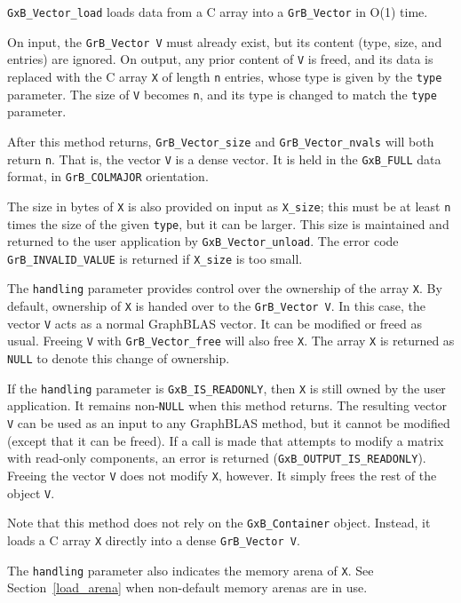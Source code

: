 \verb'GxB_Vector_load' loads data from a C array into a \verb'GrB_Vector' in
O(1) time.

On input, the \verb'GrB_Vector V' must already exist, but its content (type,
size, and entries) are ignored.  On output, any prior content of \verb'V' is
freed, and its data is replaced with the C array \verb'X' of length \verb'n'
entries, whose type is given by the \verb'type' parameter.  The size of
\verb'V' becomes \verb'n', and its type is changed to match the \verb'type'
parameter.

After this method returns, \verb'GrB_Vector_size' and \verb'GrB_Vector_nvals'
will both return \verb'n'.  That is, the vector \verb'V' is a dense vector.
It is held in the \verb'GxB_FULL' data format, in \verb'GrB_COLMAJOR'
orientation.

The size in bytes of \verb'X' is also provided on input as \verb'X_size'; this
must be at least \verb'n' times the size of the given \verb'type', but it can
be larger.  This size is maintained and returned to the user application by
\verb'GxB_Vector_unload'.  The error code \verb'GrB_INVALID_VALUE' is returned
if \verb'X_size' is too small.

The \verb'handling' parameter provides control over the ownership of the array
\verb'X'.  By default, ownership of \verb'X' is handed over to the
\verb'GrB_Vector V'.  In this case, the vector \verb'V' acts as a normal
GraphBLAS vector.  It can be modified or freed as usual.  Freeing \verb'V' with
\verb'GrB_Vector_free' will also free \verb'X'.  The array \verb'X' is returned
as \verb'NULL' to denote this change of ownership.

If the \verb'handling' parameter is \verb'GxB_IS_READONLY', then \verb'X' is
still owned by the user application.  It remains non-\verb'NULL' when this
method returns.  The resulting vector \verb'V' can be used as an input to any
GraphBLAS method, but it cannot be modified (except that it can be freed).
If a call is made that attempts to modify a matrix with read-only components,
an error is returned (\verb'GxB_OUTPUT_IS_READONLY').
Freeing the vector \verb'V' does not modify \verb'X', however.  It simply
frees the rest of the object \verb'V'.

Note that this method does not rely on the \verb'GxB_Container' object.
Instead, it loads a C array \verb'X' directly into a dense \verb'GrB_Vector V'.

The \verb'handling' parameter also indicates the memory arena of \verb'X'.
See Section~\ref{load_arena} when non-default memory arenas are in use.


